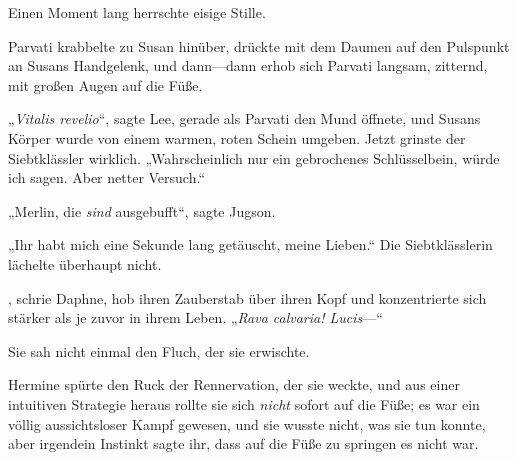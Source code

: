 Einen Moment lang herrschte eisige Stille.

Parvati krabbelte zu Susan hinüber, drückte mit dem Daumen auf den Pulspunkt an Susans Handgelenk, und dann—dann erhob sich Parvati langsam, zitternd, mit großen Augen auf die Füße.

„\emph{Vitalis revelio}“, sagte Lee, gerade als Parvati den Mund öffnete, und Susans Körper wurde von einem warmen, roten Schein umgeben. Jetzt grinste der Siebtklässler wirklich. „Wahrscheinlich nur ein gebrochenes Schlüsselbein, würde ich sagen. Aber netter Versuch.“

„Merlin, die \emph{sind} ausgebufft“, sagte Jugson.

„Ihr habt mich eine Sekunde lang getäuscht, meine Lieben.“ Die Siebtklässlerin lächelte überhaupt nicht.

, schrie Daphne, hob ihren Zauberstab über ihren Kopf und konzentrierte sich stärker als je zuvor in ihrem Leben. „\emph{Rava calvaria! Lucis}—“

Sie sah nicht einmal den Fluch, der sie erwischte.

\later

Hermine spürte den Ruck der Rennervation, der sie weckte, und aus einer intuitiven Strategie heraus rollte sie sich \emph{nicht} sofort auf die Füße; es war ein völlig aussichtsloser Kampf gewesen, und sie wusste nicht, was sie tun konnte, aber irgendein Instinkt sagte ihr, dass auf die Füße zu springen es nicht war.

